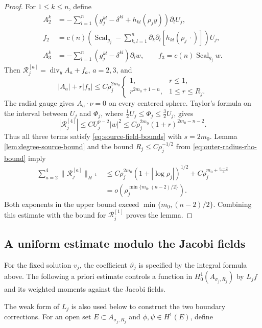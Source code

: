 \documentclass[11pt]{article}
\numberwithin{equation}{section}
\theoremstyle{remark}
\begin{document}
\begin{proof}
For \(1\le k\le n\), define
\[
 \begin{aligned}
 A_2^k&=-\sum_{l=1}^n
 (g_j^{kl}-\delta^{kl}+h_{kl}(\rho_jy))\partial_lU_j,\\
 f_2&=c(n)\left(\operatorname{Scal}_{g_j}-\sum_{k,l=1}^n
 \partial_k\partial_l[h_{kl}(\rho_j\,\cdot)]\right)U_j,\\
 A_3^k&=-\sum_{l=1}^n(g_j^{kl}-\delta^{kl})\partial_lw,
 \qquad f_3=c(n)\operatorname{Scal}_{g_j}w.
 \end{aligned}
\]
Then \(\mathcal R_j^{[a]}=\operatorname{div}_yA_a+f_a\), \(a=2,3\), and
\[
 |A_a|+r|f_a|\le C\rho_j^{2m_0}
 \begin{cases}
  1,&r\le1,\\
  r^{2m_0+1-n},&1\le r\le R_j.
 \end{cases}
\]
The radial gauge gives \(A_a\cdot\nu=0\) on every centered sphere.
Taylor's formula on the interval between \(U_j\) and \(\Phi_j\), where
\(\frac{1}{2}U_j\le\Phi_j\le\frac{3}{2}U_j\), gives
\[
 |\mathcal R_j^{[4]}|
 \le CU_j^{p-2}|w|^2
 \le C\rho_j^{2m_0}(1+r)^{2m_0-n-2}.
\]
Thus all three terms satisfy \eqref{eq:source-field-bounds} with \(s=2m_0\).
Lemma  \ref{lem:degree-source-bound} and the bound
\(R_j\le C\rho_j^{-1/2}\) from
\eqref{eq:outer-radius-rho-bound} imply
\[
 \begin{aligned}
 \sum_{a=2}^4\|\mathcal R_j^{[a]}\|_{\dot H^{-1}}
 &\le C\rho_j^{2m_0}(1+|\log\rho_j|)^{1/2}
       +C\rho_j^{m_0+\frac{n-2}{4}}\\
 &=o\!\left(\rho_j^{\min\{m_0,(n-2)/2\}}\right).
 \end{aligned}
\]
Both exponents in the upper bound exceed \(\min\{m_0,(n-2)/2\}\).
Combining this estimate with the bound for
\(\mathcal R_j^{[1]}\) proves the lemma.
\end{proof}

\subsection{A uniform estimate modulo the Jacobi fields}

For the fixed solution \(v_j\), the coefficient \(\vartheta_j\) is
specified by the integral formula above. The following a priori estimate
controls a function in \(H_0^1(A_{\sigma_j,R_j})\) by \(L_jf\) and its
weighted moments against the Jacobi fields.

The weak form of \(L_j\) is also used below to construct the two boundary
corrections. For an open set \(E\subset A_{\sigma_j,R_j}\) and
\(\phi,\psi\in H^1(E)\), define
 
\end{document}
